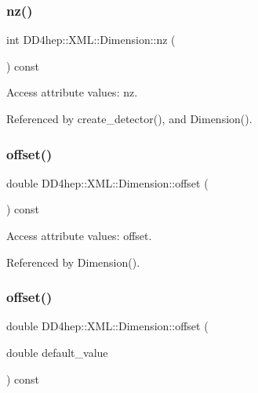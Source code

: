 \subsubsection{\texorpdfstring{nz()}{nz()}}
{\footnotesize\ttfamily int D\+D4hep\+::\+X\+M\+L\+::\+Dimension\+::nz (\begin{DoxyParamCaption}{ }\end{DoxyParamCaption}) const}



Access attribute values\+: nz. 



Referenced by create\+\_\+detector(), and Dimension().

\hypertarget{struct_d_d4hep_1_1_x_m_l_1_1_dimension_a46cb9d10f0207a64759f5135a84f2bbd}{}\label{struct_d_d4hep_1_1_x_m_l_1_1_dimension_a46cb9d10f0207a64759f5135a84f2bbd} 
\subsubsection{\texorpdfstring{offset()}{offset()}\hspace{0.1cm}{\footnotesize\ttfamily [1/2]}}
{\footnotesize\ttfamily double D\+D4hep\+::\+X\+M\+L\+::\+Dimension\+::offset (\begin{DoxyParamCaption}{ }\end{DoxyParamCaption}) const}



Access attribute values\+: offset. 



Referenced by Dimension().

\hypertarget{struct_d_d4hep_1_1_x_m_l_1_1_dimension_aef4ee2fa8e9cccea944d648305df69fc}{}\label{struct_d_d4hep_1_1_x_m_l_1_1_dimension_aef4ee2fa8e9cccea944d648305df69fc} 
\subsubsection{\texorpdfstring{offset()}{offset()}\hspace{0.1cm}{\footnotesize\ttfamily [2/2]}}
{\footnotesize\ttfamily double D\+D4hep\+::\+X\+M\+L\+::\+Dimension\+::offset (\begin{DoxyParamCaption}\item[{double}]{default\+\_\+value }\end{DoxyParamCaption}) const}



